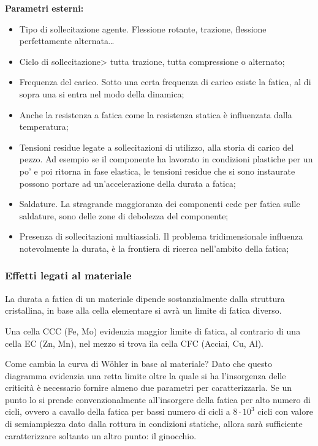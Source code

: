 			\textbf{Parametri esterni:}
 			\begin{itemize}
 				\item Tipo di sollecitazione agente. Flessione rotante, trazione, flessione perfettamente alternata\dots 
 				\item Ciclo di sollecitazione> tutta trazione, tutta compressione o alternato; 
 				\item Frequenza del carico. Sotto una certa frequenza di carico esiste la fatica, al di sopra una si entra nel modo della dinamica;
 				\item Anche la resistenza a fatica come la resistenza statica è influenzata dalla temperatura;
 				\item Tensioni residue legate a sollecitazioni di utilizzo, alla storia di carico del pezzo. Ad esempio se il componente ha lavorato in condizioni plastiche per un po' e poi ritorna in fase elastica, le tensioni residue che si sono instaurate possono portare ad un'accelerazione della durata a fatica;
 				\item Saldature. La stragrande maggioranza dei componenti cede per fatica sulle saldature, sono delle zone di debolezza del componente;
 				\item Presenza di sollecitazioni multiassiali. Il problema tridimensionale influenza notevolmente la durata, è la frontiera di ricerca nell'ambito della fatica;
 			\end{itemize} 
 						
\subsubsection{Effetti legati al materiale }
			La durata a fatica di un materiale dipende sostanzialmente dalla struttura cristallina, in base alla cella elementare si avrà un limite di fatica diverso. 
			
			Una cella CCC (Fe, Mo) evidenzia maggior limite di fatica, al contrario di una cella EC (Zn, Mn), nel mezzo si trova ila cella CFC (Acciai, Cu, Al). \newline
			
			Come cambia la curva di Wöhler in base al materiale? Dato che questo diagramma evidenzia una retta limite oltre la quale si ha l'insorgenza delle criticità è necessario fornire almeno due parametri per caratterizzarla. Se un punto lo si prende convenzionalmente all'insorgere della fatica per alto numero di cicli, ovvero a cavallo della fatica per bassi numero di cicli a $8\cdot10^3$ cicli con valore di semiampiezza dato dalla rottura in condizioni statiche, allora sarà sufficiente caratterizzare soltanto un altro punto: il ginocchio.
			
